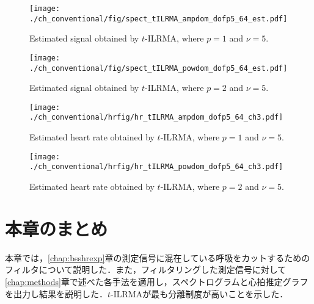 \begin{figure}[tb]
\centering
\texttt{[image: ./ch\_conventional/fig/spect\_tILRMA\_ampdom\_dofp5\_64\_est.pdf]}
\caption{Estimated signal obtained by $t$-ILRMA, where $p=1$ and $\nu=5$.}
\label{fig:stilrmaa5}
\end{figure}

\begin{figure}[tb]
\centering
\texttt{[image: ./ch\_conventional/fig/spect\_tILRMA\_powdom\_dofp5\_64\_est.pdf]}
\caption{Estimated signal obtained by $t$-ILRMA, where $p=2$ and $\nu=5$.}
\label{fig:stilrmap5}
\end{figure}

\begin{figure}[tb]
\centering
\texttt{[image: ./ch\_conventional/hrfig/hr\_tILRMA\_ampdom\_dofp5\_64\_ch3.pdf]}
\caption{Estimated heart rate obtained by $t$-ILRMA, where $p=1$ and $\nu=5$.}
\label{fig:hrtilrmaa5}
\end{figure}

\begin{figure}[tb]
\centering
\texttt{[image: ./ch\_conventional/hrfig/hr\_tILRMA\_powdom\_dofp5\_64\_ch3.pdf]}
\caption{Estimated heart rate obtained by $t$-ILRMA, where $p=2$ and $\nu=5$.}
\label{fig:hrtilrmap5}
\end{figure}

\section{本章のまとめ}
本章では，\ref{chap:bsshrexp}章の測定信号に混在している呼吸をカットするためのフィルタについて説明した．また，フィルタリングした測定信号に対して\ref{chap:methods}章で述べた各手法を適用し，スペクトログラムと心拍推定グラフを出力し結果を説明した．$t$-ILRMAが最も分離制度が高いことを示した．